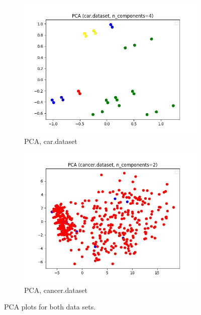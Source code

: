 \documentclass{article}
\begin{document}
      \begin{figure}[htb]
      \centering

        \begin{subfigure}{0.5\textwidth}
          \includegraphics[width=\linewidth]{out/pca/car-pca-comp-4.png}
          \caption{PCA, car.dataset}
          \label{fig:pca-plot-car}
        \end{subfigure}\hfil
        \begin{subfigure}{0.5\textwidth}
          \includegraphics[width=\linewidth]{out/pca/cancer-pca-comp-2.png}
          \caption{PCA, cancer.dataset}
          \label{fig:pca-plot-cancer}
        \end{subfigure}

      \caption{PCA plots for both data sets.}
      \label{fig:pca-plot}
      \end{figure}
\end{document}
